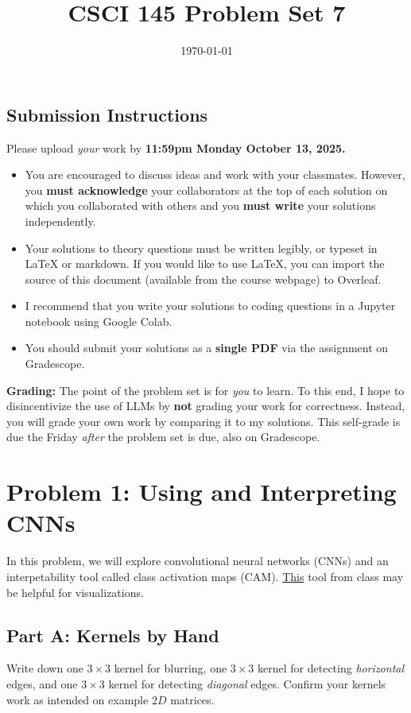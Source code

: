 \documentclass{article}
\title{CSCI 145 Problem Set 7}
\author{} %
\date{\today}
\begin{document}
\maketitle

\subsection*{Submission Instructions}

Please upload \textit{your} work by
\textbf{11:59pm Monday October 13, 2025.}
\begin{itemize}
\item You are encouraged to discuss ideas
and work with your classmates. However, you
\textbf{must acknowledge} your collaborators
at the top of each solution on which
you collaborated with others 
and you \textbf{must write} your solutions
independently.
\item Your solutions to theory questions must
be written legibly, or typeset in LaTeX or markdown.
If you would like to use LaTeX, you can import the source of this document (available from the course webpage) to Overleaf.
\item I recommend that you write your solutions to coding questions in a Jupyter notebook using Google Colab.
\item You should submit your solutions as a \textbf{single PDF} via the assignment on Gradescope.
\end{itemize}

\noindent
\textbf{Grading:} The point of the problem set is for \textit{you} to learn. To this end, I hope to disincentivize the use of LLMs by \textbf{not} grading your work for correctness. Instead, you will grade your own work by comparing it to my solutions. This self-grade is due the Friday \textit{after} the problem set is due, also on Gradescope.

\newpage
\section*{Problem 1: Using and Interpreting CNNs}

In this problem, we will explore convolutional neural networks (CNNs) and an interpetability tool called class activation maps (CAM).
\href{https://ezyang.github.io/convolution-visualizer/}{This} tool from class may be helpful for visualizations.

\subsection*{Part A: Kernels by Hand}
Write down one $3 \times 3$ kernel for blurring, one $3 \times 3$ kernel for detecting \textit{horizontal} edges, and one $3 \times 3$ kernel for detecting \textit{diagonal} edges.
Confirm your kernels work as intended on example $2D$ matrices.
\end{document}
